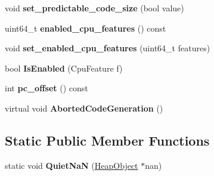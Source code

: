 \begin{DoxyCompactItemize}
\item 
\hypertarget{classv8_1_1internal_1_1_assembler_base_a8fb65d4cafef633546c2143aac9d090d}{}void {\bfseries set\+\_\+predictable\+\_\+code\+\_\+size} (bool value)\label{classv8_1_1internal_1_1_assembler_base_a8fb65d4cafef633546c2143aac9d090d}

\item 
\hypertarget{classv8_1_1internal_1_1_assembler_base_a4037253a85548558ccb31c87f27c8401}{}uint64\+\_\+t {\bfseries enabled\+\_\+cpu\+\_\+features} () const \label{classv8_1_1internal_1_1_assembler_base_a4037253a85548558ccb31c87f27c8401}

\item 
\hypertarget{classv8_1_1internal_1_1_assembler_base_a042d7907d4097ff5f4bc4cb0685b47a7}{}void {\bfseries set\+\_\+enabled\+\_\+cpu\+\_\+features} (uint64\+\_\+t features)\label{classv8_1_1internal_1_1_assembler_base_a042d7907d4097ff5f4bc4cb0685b47a7}

\item 
\hypertarget{classv8_1_1internal_1_1_assembler_base_a1eaf5b9a9d0998b6bc3104cf32c08d7c}{}bool {\bfseries Is\+Enabled} (Cpu\+Feature f)\label{classv8_1_1internal_1_1_assembler_base_a1eaf5b9a9d0998b6bc3104cf32c08d7c}

\item 
\hypertarget{classv8_1_1internal_1_1_assembler_base_a956cd6617b0ebddba1df67bfe6b138cd}{}int {\bfseries pc\+\_\+offset} () const \label{classv8_1_1internal_1_1_assembler_base_a956cd6617b0ebddba1df67bfe6b138cd}

\item 
\hypertarget{classv8_1_1internal_1_1_assembler_base_aa5bf23c158a9df7762e8529aeda8e25e}{}virtual void {\bfseries Aborted\+Code\+Generation} ()\label{classv8_1_1internal_1_1_assembler_base_aa5bf23c158a9df7762e8529aeda8e25e}

\end{DoxyCompactItemize}
\subsection*{Static Public Member Functions}
\begin{DoxyCompactItemize}
\item 
\hypertarget{classv8_1_1internal_1_1_assembler_base_a11f5cc896549fe763ac528492f16111e}{}static void {\bfseries Quiet\+Na\+N} (\hyperlink{classv8_1_1internal_1_1_heap_object}{Heap\+Object} $\ast$nan)\label{classv8_1_1internal_1_1_assembler_base_a11f5cc896549fe763ac528492f16111e}

\end{DoxyCompactItemize}
